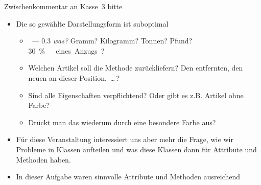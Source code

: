 {\iffull
{\AddonFrame
\begin{frame}{Zwischenkommentar an Kasse~3 bitte}
    \begin{itemize}[<+(1)->]
        \itemsep5pt
        \item Die so gewählte Darstellungsform ist suboptimal \begin{itemize}
            \itemsep3pt
            \item {}~--- \num{0.3} \textit{was?} Gramm? Kilogramm? Tonnen? Pfund? \qty{30}\percent\ eines Anzugs?
            \item Welchen Artikel soll die Methode  zurückliefern? Den entfernten, den neuen an dieser Position,~\ldots\,?
            \item Sind alle Eigenschaften verpflichtend? Oder gibt es z.B. Artikel ohne Farbe?
            \item Drückt man das wiederum durch eine besondere Farbe aus?
        \end{itemize}
        \item Für diese Veranstaltung interessiert uns aber mehr die Frage, wie wir Probleme in Klassen aufteilen und was diese Klassen dann für Attribute und Methoden haben.
        \item In dieser Aufgabe waren  sinnvolle Attribute und Methoden ausreichend
    \end{itemize}
\end{frame}
}
\fi
}



\fi


